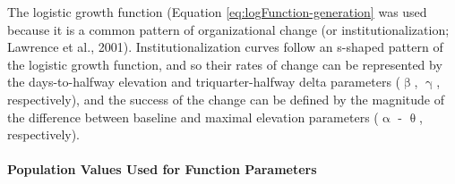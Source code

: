\documentclass[
12pt, %
twoside,
english]{guelphthesis}
\theoremstyle{definition}
\theoremstyle{definition}
\theoremstyle{definition}
\theoremstyle{definition}
\theoremstyle{remark}
\begin{document}
The logistic growth function (Equation \ref{eq:logFunction-generation}
was used because it is a common pattern of organizational change (or
institutionalization; Lawrence et al., 2001). Institutionalization curves follow
an s-shaped pattern of the logistic growth function, and so their rates
of change can be represented by the days-to-halfway elevation and
triquarter-halfway delta parameters (\(\upbeta\), \(\upgamma\),
respectively), and the success of the change can be defined by the
magnitude of the difference between baseline and maximal elevation
parameters (\(\upalpha\) - \(\uptheta\), respectively).

\hypertarget{population-values-used-for-function-parameters}{%
\paragraph{Population Values Used for Function Parameters}\label{population-values-used-for-function-parameters}}
\end{document}
